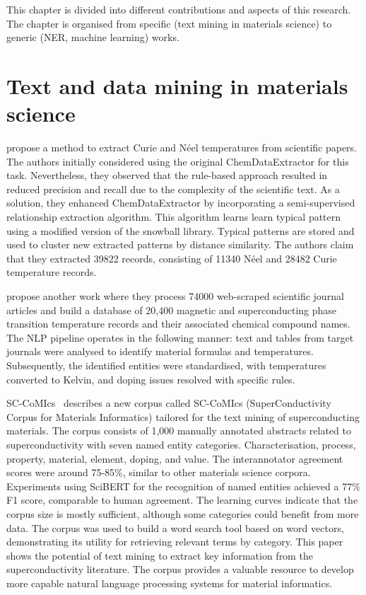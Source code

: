 
This chapter is divided into different contributions and aspects of this research.
The chapter is organised from specific (text mining in materials science) to generic (NER, machine learning) works.

\section{Text and data mining in materials science}

\cite{court2018auto} propose a method to extract Curie and Néel temperatures from scientific papers. 
The authors initially considered using the original ChemDataExtractor for this task. 
Nevertheless, they observed that the rule-based approach resulted in reduced precision and recall due to the complexity of the scientific text. As a solution, they enhanced ChemDataExtractor by incorporating a semi-supervised relationship extraction algorithm.
This algorithm learns learn typical pattern using a modified version of the snowball library. Typical patterns are stored and used to cluster new extracted patterns by distance similarity. 
The authors claim that they extracted 39822 records, consisting of 11340 Néel and 28482 Curie temperature records. 

\cite{court2020magnetic} propose another work where they process 74000 web-scraped scientific journal articles and build a database of 20,400 magnetic and superconducting phase transition temperature records and their associated chemical compound names.
The NLP pipeline operates in the following manner: text and tables from target journals were analysed to identify material formulas and temperatures. Subsequently, the identified entities were standardised, with temperatures converted to Kelvin, and doping issues resolved with specific rules.



SC-CoMIcs~\cite{yamaguchi-etal-2020-sc} describes a new corpus called SC-CoMIcs (SuperConductivity Corpus for Materials Informatics) tailored for the text mining of superconducting materials.
The corpus consists of 1,000 manually annotated abstracts related to superconductivity with seven named entity categories. Characterisation, process, property, material, element, doping, and value. The interannotator agreement scores were around 75-85\%, similar to other materials science corpora.
Experiments using SciBERT for the recognition of named entities achieved a 77\% F1 score, comparable to human agreement.
The learning curves indicate that the corpus size is mostly sufficient, although some categories could benefit from more data. The corpus was used to build a word search tool based on word vectors, demonstrating its utility for retrieving relevant terms by category. This paper shows the potential of text mining to extract key information from the superconductivity literature. The corpus provides a valuable resource to develop more capable natural language processing systems for material informatics.  

